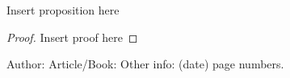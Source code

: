 \documentclass{llncs}
\begin{document}
\begin{proposition}
Insert proposition here
\end{proposition}

\begin{proof}
Insert proof here
\end{proof}



%
%

\begin{thebibliography}{1}
Author:
Article/Book:
Other info: (date) page numbers.
\end{thebibliography}
\end{document}
